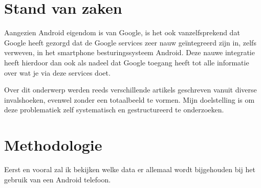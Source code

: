 
\section{Stand van zaken}
\label{sec:state-of-the-art}

Aangezien Android eigendom is van Google, is het ook vanzelfsprekend dat Google heeft gezorgd dat de Google services zeer nauw geïntegreerd zijn in, zelfs verweven, in het smartphone besturingssysteem Android. Deze nauwe integratie heeft hierdoor dan ook als nadeel dat Google toegang heeft tot alle informatie over wat je via deze services doet.

\vspace{2mm}

Over dit onderwerp werden reeds verschillende artikels geschreven vanuit diverse invalshoeken, evenwel zonder  een totaalbeeld te vormen. Mijn doelstelling is om deze problematiek zelf systematisch en gestructureerd te onderzoeken.




\section{Methodologie}
\label{sec:methodologie}

Eerst en vooral zal ik bekijken welke data er allemaal wordt bijgehouden bij het gebruik van een Android telefoon.

